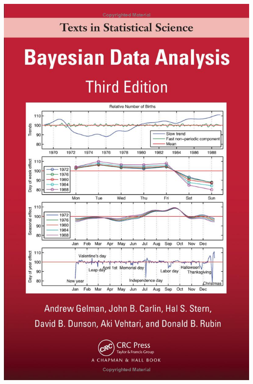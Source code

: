 \documentclass[18pt]{beamer}
\begin{document}
\begin{frame}
\begin{minipage}{.48\textwidth}
\centering
\includegraphics[height=.65\paperheight]{Figure/bda3}
\end{minipage}

\end{frame}
\end{document}
